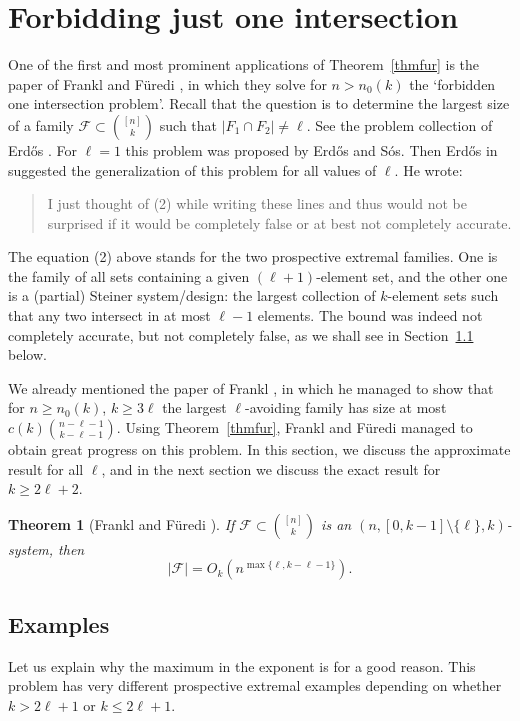 \documentclass[graybox]{svmult}
\renewcommand{\le}{\leqslant}
\renewcommand{\ge}{\geqslant}
\newcommand{\ff}{\mathcal{F}}
\newtheorem{thm}{Theorem}
\begin{document}
\section{Forbidding just one intersection}\label{sec33}  One of the first and most prominent applications of Theorem~\ref{thmfur} is the paper of Frankl and F\"uredi \cite{FF1}, in which they solve for $n>n_0(k)$ the `forbidden one intersection problem'. Recall that the question is to determine the largest size of a family $\ff\subset {[n]\choose k}$ such that $|F_1\cap F_2|\ne \ell$. See the problem collection of Erd\H os \cite[page 18]{Erd75}. For $\ell=1$ this problem was proposed by Erd\H os and S\'os. Then Erd\H os in \cite{Erd75} suggested the generalization of this problem for all values of $\ell$. He  wrote:
\begin{quote}I just thought of (2)
while writing these lines and thus would not be surprised if
it would be completely false or at best not completely
accurate.\end{quote}
The equation (2) above stands for the two prospective extremal families. One is the family of all sets containing a given $(\ell+1)$-element set, and the other one is a (partial) Steiner system/design: the largest collection of $k$-element sets such that any two intersect in at most $\ell-1$ elements. The bound was indeed not completely accurate, but not completely false, as we shall see in Section~\ref{sec331} below.

We already mentioned the paper of Frankl \cite{Fra80a}, in which he managed to show that for $n\ge n_0(k)$, $k\ge 3\ell$ the largest $\ell$-avoiding family has size at most $c(k){n-\ell-1\choose k-\ell-1}$. Using Theorem~\ref{thmfur}, Frankl and F\"uredi managed to obtain great progress on this problem. In this section, we discuss the approximate result for all $\ell$, and in the next section we discuss the exact result for $k\ge 2\ell+2$.


\begin{thm}[Frankl and F\"uredi \cite{FF1}]\label{thmff1}
  If $\ff\subset {[n]\choose k}$ is an $(n,[0,k-1]\setminus\{\ell\},k)$-system, then
  $$|\ff| = O_k(n^{\max\{\ell,k-\ell-1\}}).$$
\end{thm}

\subsection{Examples}\label{sec331} Let us explain why the maximum in the exponent is for a good reason. This problem has very different prospective extremal examples depending on whether $k>2\ell+1$ or $k\le 2\ell+1$.
\end{document}
